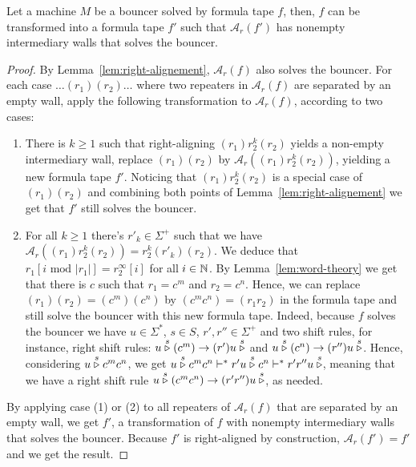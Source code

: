 \begin{lemma}\label{lem:formula-tapes-WLOG}
    Let a machine $M$ be a bouncer solved by formula tape $f$, then, $f$ can be transformed into a formula tape $f'$ such that $\mathcal{A}_r(f')$ has nonempty intermediary walls that solves the bouncer.
\end{lemma}
\begin{proof}
    By Lemma~\ref{lem:right-alignement}, $\mathcal{A}_r(f)$ also solves the bouncer. For each case $\dots (r_1)(r_2) \dots$ where two repeaters in $\mathcal{A}_r(f)$ are separated by an empty wall, apply the following transformation to $\mathcal{A}_r(f)$, according to two cases:

    \begin{enumerate}
        \item There is $k\geq 1$ such that right-aligning $(r_1)r_2^k(r_2)$ yields a non-empty intermediary wall, replace $(r_1)(r_2)$ by $\mathcal{A}_r((r_1)r_2^k(r_2))$, yielding a new formula tape $f'$. Noticing that $(r_1)r_2^k(r_2)$ is a special case of $(r_1)(r_2)$ and combining both points of Lemma~\ref{lem:right-alignement} we get that $f'$ still solves the bouncer.

        \item For all $k\geq 1$ there's $r'_k\in\Sigma^+$ such that we have $\mathcal{A}_r((r_1)r_2^k(r_2)) = r_2^k (r'_k)(r_2)$. We deduce that $r_1[i \text{ mod } |r_1|] = r_2^\infty[i]$ for all $i\in\mathbb{N}$. By Lemma~\ref{lem:word-theory} we get that there is $c$ such that $r_1 = c^m$ and $r_2 = c^n$. Hence, we can replace $(r_1)(r_2) = (c^m)(c^n)$ by $(c^m c^n) = (r_1 r_2)$ in the formula tape and still solve the bouncer with this new formula tape. Indeed, because $f$ solves the bouncer we have $u \in\Sigma^*$, $s\in S$, $r', r'' \in \Sigma^+$ and two shift rules, for instance, right shift rules: $u \stackrel{s}\triangleright (c^m) \to (r') u \stackrel{s}\triangleright$ and $u \stackrel{s}\triangleright (c^n) \to (r'') u \stackrel{s}\triangleright$. Hence, considering $u  \stackrel{s}\triangleright c^m c^n$, we get $u  \stackrel{s}\triangleright c^m c^n \vdash^* r' u  \stackrel{s}\triangleright c^n \vdash^* r' r'' u  \stackrel{s}\triangleright$, meaning that we have a right shift rule $u \stackrel{s}\triangleright (c^m c^n) \to (r'r'') u \stackrel{s}\triangleright$, as needed.

    \end{enumerate}

    By applying case (1) or (2) to all repeaters of $\mathcal{A}_r(f)$ that are separated by an empty wall, we get $f'$, a transformation of $f$ with nonempty intermediary walls that solves the bouncer. Because $f'$ is right-aligned by construction, $\mathcal{A}_r(f') = f'$  and we get the result.

\end{proof}


